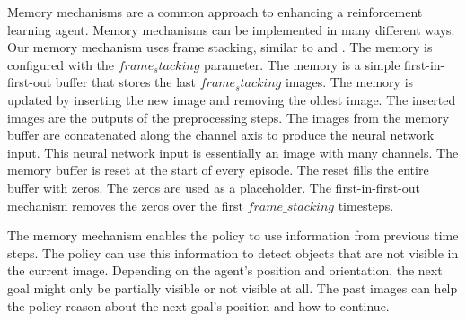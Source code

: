 Memory mechanisms are a common approach to enhancing a reinforcement learning agent. Memory mechanisms can be implemented in many different ways. Our memory mechanism uses frame stacking, similar to \autocite{maximilian} and \autocite{atari}. The memory is configured with the $frame_stacking$ parameter. The memory is a simple first-in-first-out buffer that stores the last $frame_stacking$ images. The memory is updated by inserting the new image and removing the oldest image. The inserted images are the outputs of the preprocessing steps.
The images from the memory buffer are concatenated along the channel axis to produce the neural network input. This neural network input is essentially an image with many channels.
The memory buffer is reset at the start of every episode. The reset fills the entire buffer with zeros. The zeros are used as a placeholder. The first-in-first-out mechanism removes the zeros over the first $frame\_stacking$ timesteps.

The memory mechanism enables the policy to use information from previous time steps. The policy can use this information to detect objects that are not visible in the current image. Depending on the agent's position and orientation, the next goal might only be partially visible or not visible at all. The past images can help the policy reason about the next goal's position and how to continue.



\newcommand{\includePreprocessedImage}[1]{\texttt{[image: Bilder/latex\_images/memory\_mechanism/preprocessed\_image\_step\_\#1.png]}}
\newcommand\timestepT{5}
\newcommand\timestepTminusOne{4}
\newcommand\timestepTminusTwo{3}
\newcommand\timestepTminusThree{2}
\newcommand\timestepTminusFour{1}
\newcommand\imagesOffsetY{0}
\newcommand\inOutImageHeight{0.75}
\newcommand\bufferXOffset{-2}
\newcommand\bufferWidth{7}


\usetikzlibrary{fit}

